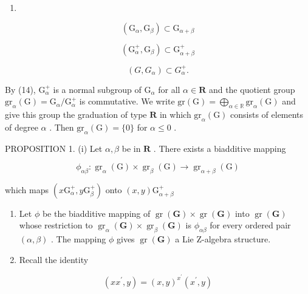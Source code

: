 \begin{enumerate}
\def\labelenumi{(\arabic{enumi})}
\setcounter{enumi}{12}
\tightlist
\item
\end{enumerate}

\[
\left(\mathrm{G} _ {\alpha}, \mathrm{G} _ {\beta}\right) \subset \mathrm{G} _ {\alpha + \beta}\tag{13}
\]

\[
\left(\mathrm{G} _ {\alpha} ^ {+}, \mathrm{G} _ {\beta}\right) \subset \mathrm{G} _ {\alpha + \beta} ^ {+}\tag{13'}
\]

\[
(G, G _ {\alpha}) \subset G _ {\alpha} ^ {+}.\tag{14}
\]

By (14), \(\mathrm{G}_{\alpha}^{+}\) is a normal subgroup of \(\mathrm{G}_{\alpha}\) for all \(\alpha \in \mathbf{R}\) and the quotient group \(\mathrm{gr}_{\alpha}(\mathrm{G}) = \mathrm{G}_{\alpha} / \mathrm{G}_{\alpha}^{+}\) is commutative. We write \(\mathrm{gr}(\mathrm{G}) = \bigoplus_{\alpha \in \mathbb{R}}\mathrm{gr}_{\alpha}(\mathrm{G})\) and give this group the graduation of type \(\mathbf{R}\) in which \(\mathrm{gr}_{\alpha}(\mathrm{G})\) consists of elements of degree \(\alpha\) . Then \(\mathrm{gr}_{\alpha}(\mathrm{G}) = \{0\}\) for \(\alpha \leqslant 0\) .

PROPOSITION 1. (i) Let \(\alpha, \beta\) be in \(\mathbf{R}\) . There exists a biadditive mapping

\[
\phi_ {\alpha \beta}: \operatorname{gr} _ {\alpha} (\mathrm{G}) \times \operatorname{gr} _ {\beta} (\mathrm{G}) \rightarrow \operatorname{gr} _ {\alpha + \beta} (\mathrm{G})
\]

which maps \((x\mathrm{G}_{\alpha}^{+},y\mathrm{G}_{\beta}^{+})\) onto \((x,y)\mathrm{G}_{\alpha +\beta}^{+}\)

\begin{enumerate}
\def\labelenumi{(\roman{enumi})}
\setcounter{enumi}{1}
\item
  Let \(\phi\) be the biadditive mapping of \(\operatorname{gr}(\mathbf{G}) \times \operatorname{gr}(\mathbf{G})\) into \(\operatorname{gr}(\mathbf{G})\) whose restriction to \(\operatorname{gr}_{\alpha}(\mathbf{G}) \times \operatorname{gr}_{\beta}(\mathbf{G})\) is \(\phi_{\alpha \beta}\) for every ordered pair \((\alpha, \beta)\) . The mapping \(\phi\) gives \(\operatorname{gr}(\mathbf{G})\) a Lie Z-algebra structure.
\item
  Recall the identity
\end{enumerate}

\[
(x x ^ {\prime}, y) = (x, y) ^ {x ^ {\prime}} \left(x ^ {\prime}, y\right)\tag{15}
\]

